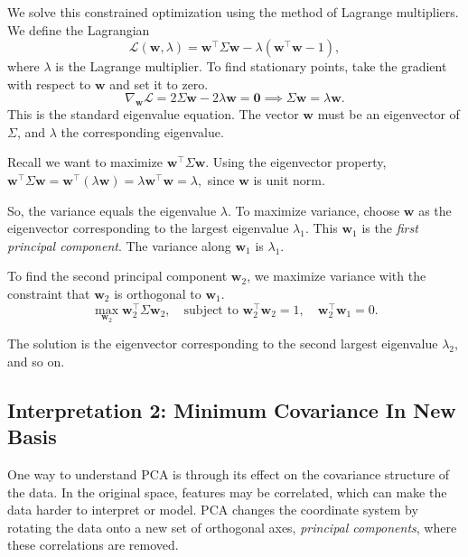 We solve this constrained optimization using the method of Lagrange multipliers. We define the Lagrangian
\[
\mathcal{L}(\mathbf{w}, \lambda) = \mathbf{w}^\top \Sigma \mathbf{w} - \lambda (\mathbf{w}^\top \mathbf{w} - 1),
\]
where \(\lambda\) is the Lagrange multiplier. To find stationary points, take the gradient with respect to \(\mathbf{w}\) and set it to zero.
\[
\nabla_{\mathbf{w}} \mathcal{L} = 2 \Sigma \mathbf{w} - 2 \lambda \mathbf{w} = \mathbf{0} \implies \Sigma \mathbf{w} = \lambda \mathbf{w}.
\]
This is the standard eigenvalue equation. The vector \(\mathbf{w}\) must be an eigenvector of \(\Sigma\), and \(\lambda\) the corresponding eigenvalue.

Recall we want to maximize \(\mathbf{w}^\top \Sigma \mathbf{w}\). Using the eigenvector property,
\(
\mathbf{w}^\top \Sigma \mathbf{w} = \mathbf{w}^\top (\lambda \mathbf{w}) = \lambda \mathbf{w}^\top \mathbf{w} = \lambda,
\)
since \(\mathbf{w}\) is unit norm.

So, the variance equals the eigenvalue \(\lambda\). To maximize variance, choose \(\mathbf{w}\) as the eigenvector corresponding to the largest eigenvalue \(\lambda_1\).
This \(\mathbf{w}_1\) is the \textit{first principal component}. The variance along \(\mathbf{w}_1\) is \(\lambda_1\).

To find the second principal component \(\mathbf{w}_2\), we maximize variance with the constraint that \(\mathbf{w}_2\) is orthogonal to \(\mathbf{w}_1\).
\[
\max_{\mathbf{w}_2} \mathbf{w}_2^\top \Sigma \mathbf{w}_2, \quad \text{subject to } \mathbf{w}_2^\top \mathbf{w}_2 = 1, \quad \mathbf{w}_2^\top \mathbf{w}_1 = 0.
\]

The solution is the eigenvector corresponding to the second largest eigenvalue \(\lambda_2\), and so on.


\subsection{Interpretation 2: Minimum Covariance In New Basis}

One way to understand PCA is through its effect on the covariance structure of the data. In the original space, features may be correlated, which can make the data harder to interpret or model. PCA changes the coordinate system by rotating the data onto a new set of orthogonal axes, \textit{principal components}, where these correlations are removed.

